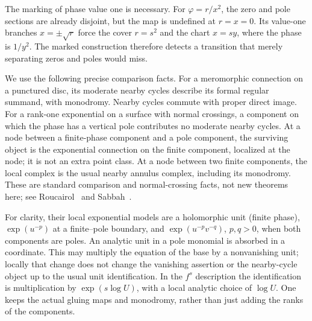 The marking of phase value one is necessary. For $\varphi=r/x^2$,
the zero and pole sections are already disjoint, but the map is
undefined at $r=x=0$. Its value-one branches $x=\pm\sqrt r$
force the cover $r=s^2$ and the chart $x=sy$, where the phase is
$1/y^2$. The marked construction therefore detects a transition
that merely separating zeros and poles would miss.


We use the following precise comparison facts. For a meromorphic
connection on a punctured disc, its moderate nearby cycles describe
its formal regular summand, with monodromy. Nearby cycles commute
with proper direct image. For a rank-one exponential on a surface
with normal crossings, a component on which the phase has a vertical
pole contributes no moderate nearby cycles. At a node between a
finite-phase component and a pole component, the surviving object is
the exponential connection on the finite component, localized at the
node; it is not an extra point class. At a node between two finite
components, the local complex is the usual nearby annulus complex,
including its monodromy. These are standard comparison and
normal-crossing facts, not new theorems here; see
Roucairol~\cite[Section~1.2 and Lemma~1.4]{RoucairolFormal} and
Sabbah~\cite[Section~1.b, especially Proposition~1.5]{SabbahStationary}.

For clarity, their local exponential models are a holomorphic unit
(finite phase), $\exp(u^{-p})$ at a finite--pole boundary, and
$\exp(u^{-p}v^{-q})$, $p,q>0$, when both components are poles.
An analytic unit in a pole monomial is absorbed in a coordinate.
This may multiply the equation of the base by a nonvanishing unit;
locally that change does not change the vanishing assertion or the
nearby-cycle object up to the usual unit identification. In the
$f^s$ description the identification is multiplication by
$\exp(s\log U)$, with a local analytic choice of $\log U$.
One keeps the actual gluing maps and monodromy, rather than just
adding the ranks of the components.

